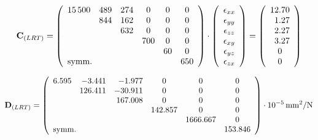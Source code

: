 \begin{equation}
\textbf{C}_{(LRT)}
=
\left(
\begin{array}{rrrccc}
\num{15500} & 489 & 274 & 0   & 0  & 0  \\
      & 844 & 162 & 0   & 0  & 0  \\
      &     & 632 & 0   & 0  & 0  \\
      &     &     & 700 & 0  & 0  \\
      &     &     &     & 60 & 0  \\
   \multicolumn{2}{l}{\text{symm.}}  
            &     &     &    & 650 \\
\end{array}
\right)
%
\cdot
%
\left(
   \begin{array}{c}
      \epsilon_{xx} \\
      \epsilon_{yy} \\
      \epsilon_{zz} \\
      \epsilon_{xy} \\
      \epsilon_{yz} \\
      \epsilon_{zx} \\
   \end{array}
\right)
=
\left(
   \begin{array}{r}
      \num{12,70} \\
      \num{1,27}  \\
      \num{2,27}  \\
      \num{3,27}  \\
      \multicolumn{1}{c}{0}     \\
      \multicolumn{1}{c}{0}     \\
   \end{array}
\right)
\label{Glg:C-matrix}
\end{equation}

\begin{equation}
\textbf{D}_{(LRT)}
=
\left(
   \begin{array}{rrrccc}
\num{6,595} &  \num{-3,441} &  \num{-1,977} &  0  &  0  & 0 \\
            & \num{126,411} & \num{-30,911} &  0  &  0  & 0 \\
            &               & \num{167,008} &  0  &  0  & 0 \\
            &               &               & \num{142,857} &  0  &  0  \\
            &               &               &    & \num{1666,667}  &  0  \\
   \multicolumn{2}{l}{\text{symm.}} &       &    &      & \num{153,846}  \\
\end{array}
\right)
\cdot \SI{e-5}{mm^2/N}
\label{Glg:D-matrix}
\end{equation}



